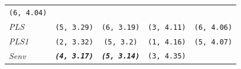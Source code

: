 \documentclass[12pt,A4paper,authoryear]{elsarticle} %
\theoremstyle{definition}
\theoremstyle{definition}
\theoremstyle{remark}
\begin{document}
\begin{longtable}[]{@{}lcccc@{}}
\begin{minipage}[t]{0.19\columnwidth}
\texttt{(6,\ 4.04)}\strut
\end{minipage}\tabularnewline
\begin{minipage}[t]{0.09\columnwidth}\raggedright\strut
\emph{PLS}\strut
\end{minipage} & \begin{minipage}[t]{0.19\columnwidth}\centering\strut
\texttt{(5,\ 3.29)}\strut
\end{minipage} & \begin{minipage}[t]{0.19\columnwidth}\centering\strut
\texttt{(6,\ 3.19)}\strut
\end{minipage} & \begin{minipage}[t]{0.19\columnwidth}\centering\strut
\texttt{(3,\ 4.11)}\strut
\end{minipage} & \begin{minipage}[t]{0.19\columnwidth}\centering\strut
\texttt{(6,\ 4.06)}\strut
\end{minipage}\tabularnewline
\begin{minipage}[t]{0.09\columnwidth}\raggedright\strut
\emph{PLS1}\strut
\end{minipage} & \begin{minipage}[t]{0.19\columnwidth}\centering\strut
\texttt{(2,\ 3.32)}\strut
\end{minipage} & \begin{minipage}[t]{0.19\columnwidth}\centering\strut
\texttt{(5,\ 3.2)}\strut
\end{minipage} & \begin{minipage}[t]{0.19\columnwidth}\centering\strut
\texttt{(1,\ 4.16)}\strut
\end{minipage} & \begin{minipage}[t]{0.19\columnwidth}\centering\strut
\texttt{(5,\ 4.07)}\strut
\end{minipage}\tabularnewline
\begin{minipage}[t]{0.09\columnwidth}\raggedright\strut
\emph{Senv}\strut
\end{minipage} & \begin{minipage}[t]{0.19\columnwidth}\centering\strut
\textbf{\emph{\texttt{(4,\ 3.17)}}}\strut
\end{minipage} & \begin{minipage}[t]{0.19\columnwidth}\centering\strut
\textbf{\emph{\texttt{(5,\ 3.14)}}}\strut
\end{minipage} & \begin{minipage}[t]{0.19\columnwidth}\centering\strut
\texttt{(3,\ 4.35)}\strut
\end{minipage} & \begin{minipage}[t]{0.19\columnwidth}\centering\strut

\end{minipage}
\end{longtable}
\end{document}
